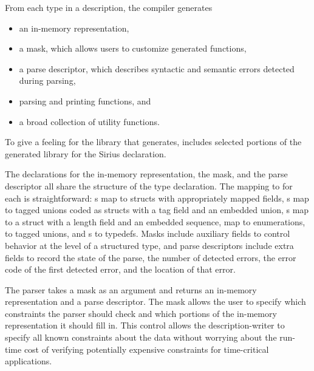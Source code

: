 \documentclass{sig-alternate}
\newcommand{\dibbler}{Sirius}
\begin{document}
From each type in a \pads{} description, the compiler generates 
\begin{itemize}
\setlength{\itemsep}{0ex plus0.2ex}
\item an in-memory representation, 
\item a mask, which allows users to customize generated functions,
\item a parse descriptor, which describes syntactic and
semantic errors detected during parsing, 
\item parsing and printing functions, and 
\item a broad collection of utility functions.
\end{itemize}
%
\setcounter{totalnumber}{1}
\setcounter{dbltopnumber}{1}
\renewcommand{\topfraction}{0.85}
\renewcommand{\textfraction}{0.1}
\renewcommand{\floatpagefraction}{0.75}
\begin{figure*}
\begin{tiny}

\caption{Selected portions of the library generated for the \texttt{entry\_t}
  declaration from \dibbler{} data description.}
\label{figure:library}
\end{tiny}
\end{figure*}
To give a feeling for the library that \pads{} generates, 
 includes selected portions of the generated 
library for the \dibbler{}  declaration.

The \C{} declarations for the in-memory representation, the mask, 
and the parse descriptor all share the structure of the \pads{}
type declaration.  The mapping to \C{} for each is straightforward: 
s map to \C{} structs with appropriately mapped fields, 
s map to tagged unions coded as \C{} structs with a tag field 
and an embedded 
union, s map to a \C{} struct with a length field and an 
embedded sequence,  map to \C{} enumerations,  
to tagged unions, and s to \C{} typedefs.  Masks include
auxiliary fields to control behavior at the level of a structured
type, and parse descriptors include extra fields to record the 
state of the parse, the number of detected errors, 
the error code of the first detected error, and the location of that error.

The parser takes a mask as an argument and returns an
in-memory representation and a parse descriptor.  
The mask allows the user to specify 
which constraints the parser should check and which portions of the
in-memory representation it should fill in.  This control allows the
description-writer to specify all known constraints about the data
without worrying about the run-time cost of verifying potentially
expensive constraints for time-critical applications.
\end{document}

